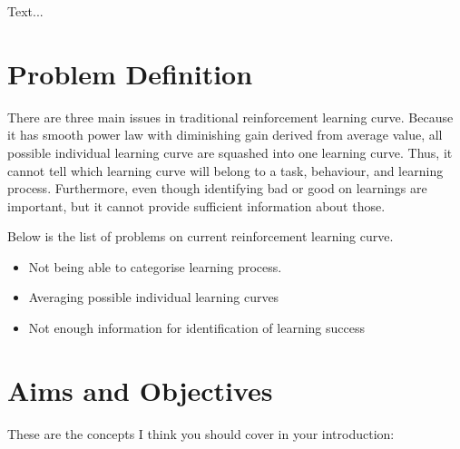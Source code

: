 \documentclass[12pt,a4paper]{report}
\begin{document}

Text...


\section{Problem Definition}

There are three main issues in traditional reinforcement learning curve. Because it has smooth power law with diminishing gain derived from average value, all possible individual learning curve are squashed into one learning curve. Thus, it cannot tell which learning curve will belong to a task, behaviour, and learning process. Furthermore, even though identifying bad or good on learnings are important, but it cannot provide sufficient information about those.

Below is the list of problems on current reinforcement learning curve.

\begin{itemize}
\item Not being able to categorise learning process.
\item Averaging possible individual learning curves
\item Not enough information for identification of learning success
\end{itemize}




\section{Aims and Objectives}
These are the concepts I think you should cover in your introduction:
\end{document}
